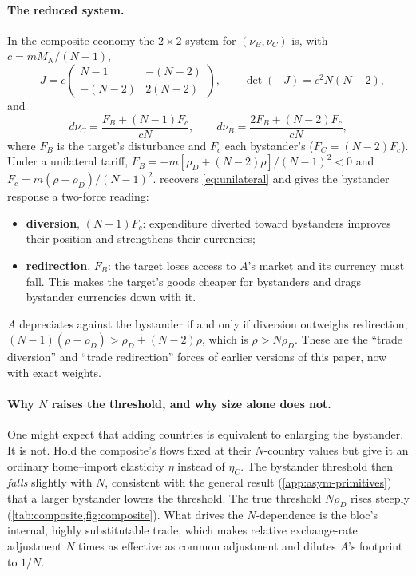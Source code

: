 \paragraph{The reduced system.} In the composite economy the $2\times2$ system for $(\nu_B,\nu_C)$ is, with $c=mM_N/(N-1)$,
\begin{equation}
-J=c\begin{pmatrix}N-1&-(N-2)\\-(N-2)&2(N-2)\end{pmatrix},\qquad \det(-J)=c^2N(N-2),
\label{eq:reducedJ}
\end{equation}
and
\begin{equation}
d\nu_C=\frac{F_B+(N-1)F_c}{cN},\qquad d\nu_B=\frac{2F_B+(N-2)F_c}{cN},
\label{eq:reducedsol}
\end{equation}
where $F_B$ is the target's disturbance and $F_c$ each bystander's ($F_C=(N-2)F_c$). Under a unilateral tariff, $F_B=-m[\rho_D+(N-2)\rho]/(N-1)^2<0$ and $F_c=m(\rho-\rho_D)/(N-1)^2$.  recovers \cref{eq:unilateral} and gives the bystander response a two-force reading:
\begin{itemize}
\item \textbf{diversion}, $(N-1)F_c$: expenditure diverted toward bystanders improves their position and strengthens their currencies;
\item \textbf{redirection}, $F_B$: the target loses access to $A$'s market and its currency must fall. This makes the target's goods cheaper for bystanders and drags bystander currencies down with it.
\end{itemize}
$A$ depreciates against the bystander if and only if diversion outweighs redirection, $(N-1)(\rho-\rho_D)>\rho_D+(N-2)\rho$, which is $\rho>N\rho_D$. These are the ``trade diversion'' and ``trade redirection'' forces of earlier versions of this paper, now with exact weights.

\paragraph{Why $N$ raises the threshold, and why size alone does not.} One might expect that adding countries is equivalent to enlarging the bystander. It is not. Hold the composite's flows fixed at their $N$-country values but give it an ordinary home--import elasticity $\eta$ instead of $\eta_C$. The bystander threshold then \emph{falls} slightly with $N$, consistent with the general result (\cref{app:asym-primitives}) that a larger bystander lowers the threshold. The true threshold $N\rho_D$ rises steeply (\cref{tab:composite,fig:composite}). What drives the $N$-dependence is the bloc's internal, highly substitutable trade, which makes relative exchange-rate adjustment $N$ times as effective as common adjustment and dilutes $A$'s footprint to $1/N$.

